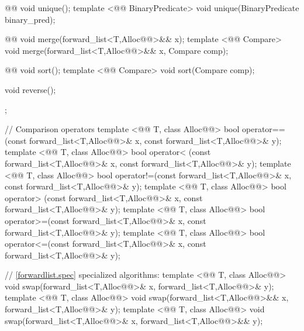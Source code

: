 \documentclass[american,twoside]{book}
\begin{document}
\begin{codeblock}
{{    @@ void unique(); 
    template <@@ BinaryPredicate>
      void unique(BinaryPredicate binary_pred);

    @@ void merge(forward_list<T,Alloc@@>&& x); 
    template <@@ Compare> 
      void merge(forward_list<T,Alloc@@>&& x, Compare comp);

    @@ void sort(); 
    template <@@ Compare> void sort(Compare comp); 

    void reverse(); 
  }; 

  // Comparison operators
  template <@@ T, class Alloc@@> 
    bool operator==(const forward_list<T,Alloc@@>& x, const forward_list<T,Alloc@@>& y); 
  template <@@ T, class Alloc@@> 
    bool operator< (const forward_list<T,Alloc@@>& x, const forward_list<T,Alloc@@>& y); 
  template <@@ T, class Alloc@@> 
    bool operator!=(const forward_list<T,Alloc@@>& x, const forward_list<T,Alloc@@>& y); 
  template <@@ T, class Alloc@@> 
    bool operator> (const forward_list<T,Alloc@@>& x, const forward_list<T,Alloc@@>& y); 
  template <@@ T, class Alloc@@> 
    bool operator>=(const forward_list<T,Alloc@@>& x, const forward_list<T,Alloc@@>& y); 
  template <@@ T, class Alloc@@> 
    bool operator<=(const forward_list<T,Alloc@@>& x, const forward_list<T,Alloc@@>& y); 

  // \ref{forwardlist.spec} specialized algorithms: 
  template <@@ T, class Alloc@@> 
    void swap(forward_list<T,Alloc@@>& x, forward_list<T,Alloc@@>& y);
  template <@@ T, class Alloc@@> 
    void swap(forward_list<T,Alloc@@>&& x, forward_list<T,Alloc@@>& y);
  template <@@ T, class Alloc@@> 
    void swap(forward_list<T,Alloc@@>& x, forward_list<T,Alloc@@>&& y); 
}
\end{codeblock}
\end{document}
